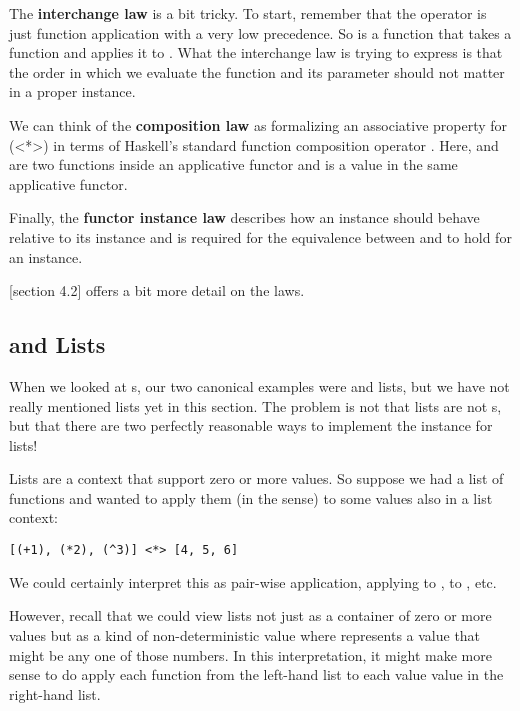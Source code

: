 The \textbf{interchange law} is a bit tricky. To start, remember that the \code{(\$)} operator is just function application
with a very low precedence. So  is a function that takes a function and applies it to .
What the interchange law is trying to express is that the order in which we evaluate the function and its 
parameter should not matter in a proper  instance.

We can think of the \textbf{composition law} as formalizing an associative property for \code(<*>) in terms 
of Haskell's standard function composition operator . Here,  and 
are two functions inside an applicative functor  and  is a value in the same applicative functor.

Finally, the \textbf{functor instance law} describes how an  instance should behave relative to
its  instance and is required for the equivalence between \code{(<\$>)} and  to hold for
an  instance.

\cite{typeclassopedia}[section 4.2] offers a bit more detail on the  laws.

\subsection{ and Lists}

When we looked at s, our two canonical examples were  and lists, but we have not really mentioned
lists yet in this section. The problem is not that lists are not s, but that there are two perfectly
reasonable ways to implement the  instance for lists!

Lists are a context that support zero or more values. So suppose we had a list of functions and wanted to apply them
(in the  sense) to some values also in a list context: 

\begin{lstlisting}
[(+1), (*2), (^3)] <*> [4, 5, 6]
\end{lstlisting}

We could certainly interpret this as pair-wise application, applying  to ,  to , etc.

However, recall that we could view lists not just as a container of zero or more values but as a kind of non-deterministic value
where \code{[4, 5, 6]} represents a value that might be any one of those numbers. In this interpretation, it might make more
sense to do apply each function from the left-hand list to each value value in the right-hand list.

